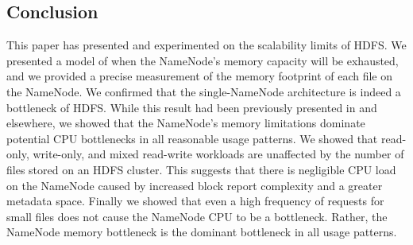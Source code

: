 \documentclass[11pt, a4paper]{article}
\begin{document}
\begin{multicols*}{2}
\section{Conclusion}
This paper has presented and experimented on the scalability limits of HDFS. We presented a model of when the NameNode's memory capacity will be exhausted, and we provided a precise measurement of the memory footprint of each file on the NameNode. We confirmed that the single-NameNode architecture is indeed a bottleneck of HDFS. While this result had been previously presented in \cite{HdfsScale} and elsewhere, we showed that the NameNode's memory limitations dominate potential CPU bottlenecks in all reasonable usage patterns. We showed that read-only, write-only, and mixed read-write workloads are unaffected by the number of files stored on an HDFS cluster. This suggests that there is negligible CPU load on the NameNode caused by increased block report complexity and a greater metadata space. Finally we showed that even a high frequency of requests for small files does not cause the NameNode CPU to be a bottleneck. Rather, the NameNode memory bottleneck is the dominant bottleneck in all usage patterns.


\end{multicols*}
\end{document}
